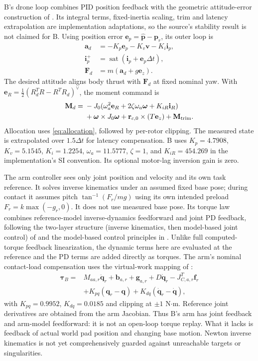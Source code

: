 \documentclass[conference]{IEEEtran}
\newcommand{\sat}{\operatorname{sat}}
\begin{document}
B's drone loop combines PID position feedback with the geometric attitude-error construction of \cite[Secs.~IV--V]{lee2011}. Its integral terms, fixed-inertia scaling, trim and latency extrapolation are implementation adaptations, so the source's stability result is not claimed for B. Using position error $\mathbf e_p=\hat{\mathbf p}-\mathbf p_r$, its outer loop is
\begin{align}
\mathbf a_d&=-K_p\mathbf e_p-K_v\mathbf v-K_i\mathbf i_p,\\
\mathbf i_p^+&=\sat(\mathbf i_p+\mathbf e_p\Delta t),\\
\mathbf F_d&=m(\mathbf a_d+g\mathbf e_z).
\end{align}
The desired attitude aligns body thrust with $\mathbf F_d$ at fixed nominal yaw. With $\mathbf e_R=\tfrac12(R_d^TR-R^TR_d)^\vee$, the moment command is
\begin{align}
\mathbf M_d={}&-J_0(\omega_a^2\mathbf e_R+2\zeta\omega_a\boldsymbol\omega
+K_{iR}\mathbf i_R)\nonumber\\
&+\boldsymbol\omega\times J_0\boldsymbol\omega
+\mathbf r_{c,0}\times(T\mathbf e_z)+\mathbf M_{\rm trim}.
\end{align}
Allocation uses \eqref{eq:allocation}, followed by per-rotor clipping. The measured state is extrapolated over $1.5\Delta t$ for latency compensation. B uses $K_p=4.7908$, $K_v=5.1545$, $K_i=1.2254$, $\omega_a=11.5777$, $\zeta=1$, and $K_{iR}=454.269$ in the implementation's SI convention. Its optional motor-lag inversion gain is zero.

The arm controller sees only joint position and velocity and its own task reference. It solves inverse kinematics under an assumed fixed base pose; during contact it assumes pitch $\tan^{-1}(F_r/mg)$ using its own intended preload $F_r=k\max(-g_r,0)$. It does not use measured base pose. Its torque law combines reference-model inverse-dynamics feedforward and joint PD feedback, following the two-layer structure (inverse kinematics, then model-based joint control) of \cite{caccavale2014} and the model-based control principles in \cite[Sec.~11.4]{lynch2017}. Unlike full computed-torque feedback linearization, the dynamic terms here are evaluated at the reference and the PD terms are added directly as torques. The arm's nominal contact-load compensation uses the virtual-work mapping of \cite[Sec.~5.2]{lynch2017}:
\begin{align}
\boldsymbol\tau_B={}&M_{aa,r}\ddot{\mathbf q}_r+\mathbf b_{a,r}+\mathbf g_{a,r}
+D\dot{\mathbf q}_r-J_{C,a,r}^T\mathbf f_r\nonumber\\
&+K_{pq}(\mathbf q_r-\mathbf q)+K_{dq}(\dot{\mathbf q}_r-\dot{\mathbf q}),
\label{eq:baselinearm}
\end{align}
with $K_{pq}=0.9952$, $K_{dq}=0.0185$ and clipping at $\pm1$ N$\cdot$m. Reference joint derivatives are obtained from the arm Jacobian. Thus B's arm has joint feedback and arm-model feedforward: it is not an open-loop torque replay. What it lacks is feedback of actual world pad position and changing base motion. Newton inverse kinematics is not yet comprehensively guarded against unreachable targets or singularities.
\end{document}
